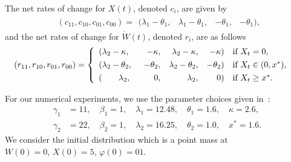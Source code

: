 \begin{model}
	The net rates of change for $X(t)$, denoted $c_i$, are given by 
	\begin{align*} 
	& (c_{11},c_{10},c_{01},c_{00})   =  \begin{array}{rrrr} 
	(\lambda_1-\theta_1,  & \lambda_1 -\theta_1, &  -\theta_1, & -\theta_1),
	\end{array}  
	\end{align*} 
	and the net rates of change for $\dot W(t)$, denoted $r_i$, are as follows  
	\begin{align*} 
	(r_{11},r_{10},r_{01},r_{00})  & = \left\{ \begin{array}{lrrrll}  
												(\lambda_2 - \kappa, & \;\;\;-\kappa,  & \lambda_2 - \kappa, & -\kappa) &\text{if } X_t = 0, \\
												\vspace*{-0.3cm} \\
		(\lambda_2 - \theta_2, & -\theta_2, & \lambda_2 - \theta_2, & -\theta_2) & \text{if } X_t \in (0,x^*),\\
												\vspace*{-0.3cm} \\
		(\;\;\;\;\;\;\; \lambda_2, & \;\;\;\;0, & \lambda_2, &  \;\;\;\;0) & \text{if } X_t \geq x^*. \end{array}
												\right.
	\end{align*} 

	For our numerical experiments, we use the parameter choices given in~\citep{lnp13}: 
		\begin{align} 
			\label{eqn:parameters}
		\gamma_1 & =11, \quad  \beta_1 = 1, \quad \lambda_1 = 12.48, \quad  \theta_1 = 1.6, \quad  \kappa = 2.6, \\
			\label{eqn:parameters-2}
		\gamma_2 & = 22, \quad \beta_2  = 1, \quad  \lambda_2 = 16.25, \quad \theta_2 = 1.0, \quad x^* = 1.6.
		\end{align} 
	We consider the initial distribution which is a point mass at \(W(0)=0,\, X(0)=5,\, \varphi(0)=01\). 
\end{model}
	
